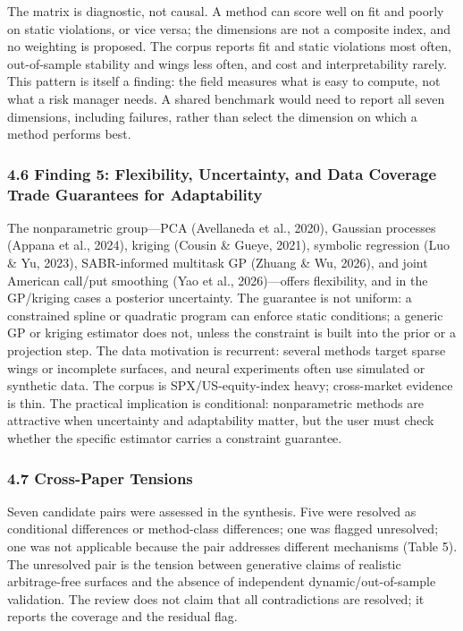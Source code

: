 \documentclass[11pt]{article}
\begin{document}
The matrix is diagnostic, not causal. A method can score well on fit and poorly on static violations, or vice versa; the dimensions are not a composite index, and no weighting is proposed. The corpus reports fit and static violations most often, out-of-sample stability and wings less often, and cost and interpretability rarely. This pattern is itself a finding: the field measures what is easy to compute, not what a risk manager needs. A shared benchmark would need to report all seven dimensions, including failures, rather than select the dimension on which a method performs best.

\subsubsection*{4.6 Finding 5: Flexibility, Uncertainty, and Data Coverage Trade Guarantees for Adaptability}
The nonparametric group—PCA (Avellaneda et al., 2020), Gaussian processes (Appana et al., 2024), kriging (Cousin \& Gueye, 2021), symbolic regression (Luo \& Yu, 2023), SABR-informed multitask GP (Zhuang \& Wu, 2026), and joint American call/put smoothing (Yao et al., 2026)—offers flexibility, and in the GP/kriging cases a posterior uncertainty. The guarantee is not uniform: a constrained spline or quadratic program can enforce static conditions; a generic GP or kriging estimator does not, unless the constraint is built into the prior or a projection step. The data motivation is recurrent: several methods target sparse wings or incomplete surfaces, and neural experiments often use simulated or synthetic data. The corpus is SPX/US-equity-index heavy; cross-market evidence is thin. The practical implication is conditional: nonparametric methods are attractive when uncertainty and adaptability matter, but the user must check whether the specific estimator carries a constraint guarantee.

\subsubsection*{4.7 Cross-Paper Tensions}
Seven candidate pairs were assessed in the synthesis. Five were resolved as conditional differences or method-class differences; one was flagged unresolved; one was not applicable because the pair addresses different mechanisms (Table 5). The unresolved pair is the tension between generative claims of realistic arbitrage-free surfaces and the absence of independent dynamic/out-of-sample validation. The review does not claim that all contradictions are resolved; it reports the coverage and the residual flag.
\end{document}

